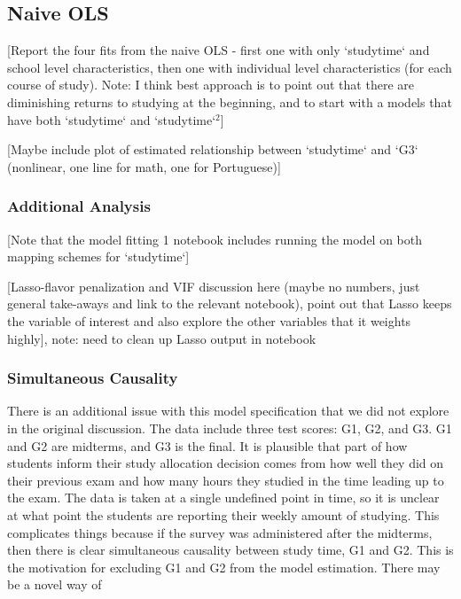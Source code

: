 \documentclass[12pt]{article}
\begin{document}
\subsection{Naive OLS}
\textcolor{BrickRed}{[Report the four fits from the naive OLS - first one with only `studytime` and school level characteristics, then one with individual level characteristics (for each course of study). Note: I think best approach is to point out that there are diminishing returns to studying at the beginning, and to start with a models that have both `studytime` and `studytime`$^2$]}

\textcolor{BrickRed}{[Maybe include plot of estimated relationship between `studytime` and `G3` (nonlinear, one line for math, one for Portuguese)]}

\subsubsection{Additional Analysis}
\textcolor{BrickRed}{[Note that the model fitting 1 notebook includes running the model on both mapping schemes for `studytime`]}

\textcolor{BrickRed}{[Lasso-flavor penalization and VIF discussion here (maybe no numbers, just general take-aways and link to the relevant notebook), point out that Lasso keeps the variable of interest and also explore the other variables that it weights highly]}, note: need to clean up Lasso output in notebook

\subsubsection{Simultaneous Causality}
There is an additional issue with this model specification that we did not explore in the original discussion. The data include three test scores: G1, G2, and G3. G1 and G2 are midterms, and G3 is the final. It is plausible that part of how students inform their study allocation decision comes from how well they did on their previous exam and how many hours they studied in the time leading up to the exam. The data is taken at a single undefined point in time, so it is unclear at what point the students are reporting their weekly amount of studying. This complicates things because if the survey was administered after the midterms, then there is clear simultaneous causality between study time, G1 and G2. This is the motivation for excluding G1 and G2 from the model estimation. There may be a novel way of 
\end{document}
